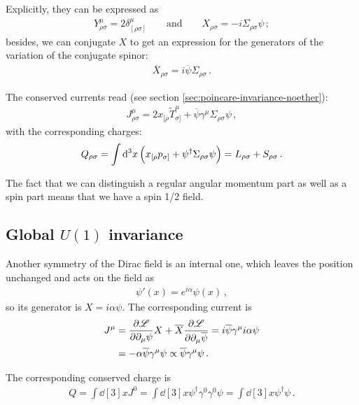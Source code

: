 \documentclass[main.tex]{subfiles}
\begin{document}
Explicitly, they can be expressed as 
%
\begin{align}
Y^{\mu }_{\rho \sigma } = 2 \delta^{\mu }_{[\rho \sigma ]}
\qquad \text{and} \qquad
X_{\rho \sigma } = -i \Sigma_{\rho \sigma } \psi 
\,;
\end{align}
%
besides, we can conjugate \(X\) to get an expression for the generators of the variation of the conjugate spinor: 
%
\begin{align}
\overline{X}_{\rho \sigma } = i \overline{\psi} \Sigma_{\rho \sigma }
\,.
\end{align}

The conserved currents read (see section \ref{sec:poincare-invariance-noether}): 
%
\begin{align}
J^{\mu }_{\rho \sigma } = 2 x_{[\rho }\widetilde{T}^{\mu }_{\sigma ]}
+ \overline{\psi} \gamma^{\mu } \Sigma_{\rho \sigma } \psi 
\,,
\end{align}
%
with the corresponding charges: 
%
\begin{align}
Q_{ \rho \sigma }
= \int \dd[3]{x} \qty(x_{[\rho } p_{\sigma ]}
+ \psi ^\dag \Sigma_{\rho \sigma } \psi )
= L_{ \rho \sigma } + S_{ \rho \sigma }
\,.
\end{align}

The fact that we can distinguish a regular angular momentum part as well as a spin part means that we have a spin 1/2 field. 

\subsection{Global \(U(1)\) invariance}

Another symmetry of the Dirac field is an internal one, which leaves the position unchanged and acts on the field as 
%
\begin{align}
\psi'(x) = e^{i \alpha } \psi (x)
\,,
\end{align}
%
so its generator is \(X = i \alpha \psi \). The corresponding current is 
%
\begin{align}
J^{\mu } &= \pdv{\mathscr{L}}{\partial_{\mu }\psi } X + \overline{X} \pdv{\mathscr{L}}{\partial_{\mu } \overline{\psi}} = i \overline{\psi} \gamma^{\mu } i \alpha \psi   \\
&= - \alpha \overline{\psi} \gamma^{\mu } \psi \propto \overline{\psi} \gamma^{\mu } \psi 
\,. 
\end{align}

The corresponding conserved charge is 
%
\begin{align}
Q = \int \dd[3]{x} J^{0} = \int \dd[3]{x} \psi ^\dag \gamma^{0} \gamma^{0} \psi = \int \dd[3]{x} \psi ^\dag \psi 
\,.
\end{align}
\end{document}
